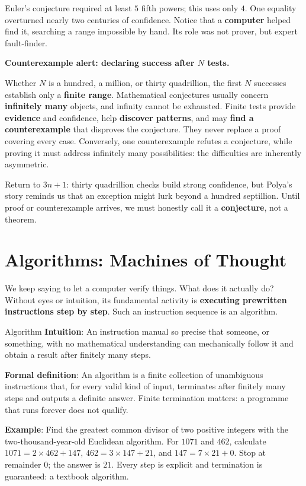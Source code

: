 Euler's conjecture required at least $5$ fifth powers; this uses only $4$. One equality overturned nearly two centuries of confidence. Notice that a \textbf{computer} helped find it, searching a range impossible by hand. Its role was not prover, but expert fault-finder.

\begin{fanli}
\textbf{Counterexample alert: declaring success after $N$ tests.}

Whether $N$ is a hundred, a million, or thirty quadrillion, the first $N$ successes establish only a \textbf{finite range}. Mathematical conjectures usually concern \textbf{infinitely many} objects, and infinity cannot be exhausted. Finite tests provide \textbf{evidence} and confidence, help \textbf{discover patterns}, and may \textbf{find a counterexample} that disproves the conjecture. They never replace a proof covering every case. Conversely, one counterexample refutes a conjecture, while proving it must address infinitely many possibilities: the difficulties are inherently asymmetric.
\end{fanli}

Return to $3n+1$: thirty quadrillion checks build strong confidence, but Polya's story reminds us that an exception might lurk beyond a hundred septillion. Until proof or counterexample arrives, we must honestly call it a \textbf{conjecture}, not a theorem.

\section{Algorithms: Machines of Thought}

We keep saying to let a computer verify things. What does it actually do? Without eyes or intuition, its fundamental activity is \textbf{executing prewritten instructions step by step}. Such an instruction sequence is an algorithm.

\begin{shuyu}{Algorithm}
\textbf{Intuition}: An instruction manual so precise that someone, or something, with no mathematical understanding can mechanically follow it and obtain a result after finitely many steps.

\textbf{Formal definition}: An algorithm is a finite collection of unambiguous instructions that, for every valid kind of input, terminates after finitely many steps and outputs a definite answer. Finite termination matters: a programme that runs forever does not qualify.

\textbf{Example}: Find the greatest common divisor of two positive integers with the two-thousand-year-old Euclidean algorithm. For $1071$ and $462$, calculate $1071 = 2 \times 462 + 147$, $462 = 3 \times 147 + 21$, and $147 = 7 \times 21 + 0$. Stop at remainder $0$; the answer is $21$. Every step is explicit and termination is guaranteed: a textbook algorithm.
\end{shuyu}

